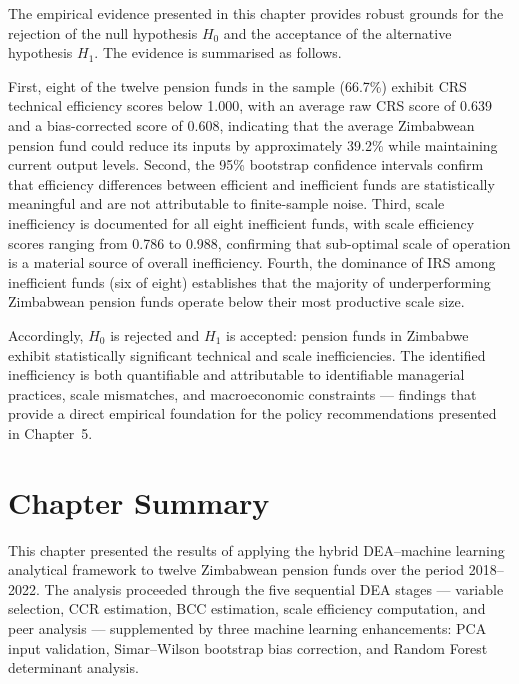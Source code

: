 \documentclass[12pt,a4paper]{article}
\begin{document}
The empirical evidence presented in this chapter provides robust grounds for the rejection of the null hypothesis $H_0$ and the acceptance of the alternative hypothesis $H_1$. The evidence is summarised as follows.

First, eight of the twelve pension funds in the sample (66.7\%) exhibit CRS technical efficiency scores below 1.000, with an average raw CRS score of 0.639 and a bias-corrected score of 0.608, indicating that the average Zimbabwean pension fund could reduce its inputs by approximately 39.2\% while maintaining current output levels. Second, the 95\% bootstrap confidence intervals confirm that efficiency differences between efficient and inefficient funds are statistically meaningful and are not attributable to finite-sample noise. Third, scale inefficiency is documented for all eight inefficient funds, with scale efficiency scores ranging from 0.786 to 0.988, confirming that sub-optimal scale of operation is a material source of overall inefficiency. Fourth, the dominance of IRS among inefficient funds (six of eight) establishes that the majority of underperforming Zimbabwean pension funds operate below their most productive scale size.

Accordingly, $H_0$ is rejected and $H_1$ is accepted: pension funds in Zimbabwe exhibit statistically significant technical and scale inefficiencies. The identified inefficiency is both quantifiable and attributable to identifiable managerial practices, scale mismatches, and macroeconomic constraints --- findings that provide a direct empirical foundation for the policy recommendations presented in Chapter~5.

\section{Chapter Summary}

This chapter presented the results of applying the hybrid DEA--machine learning analytical framework to twelve Zimbabwean pension funds over the period 2018--2022. The analysis proceeded through the five sequential DEA stages --- variable selection, CCR estimation, BCC estimation, scale efficiency computation, and peer analysis --- supplemented by three machine learning enhancements: PCA input validation, Simar--Wilson bootstrap bias correction, and Random Forest determinant analysis.
\end{document}
